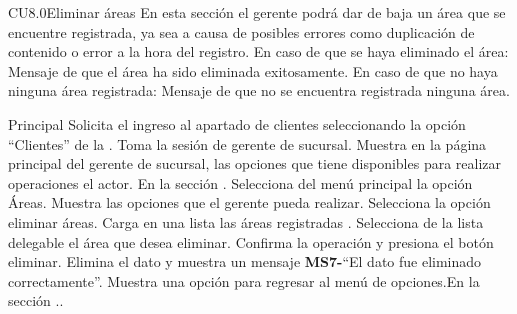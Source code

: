 

	\begin{UseCase}{CU8.0}{Eliminar áreas}{
		En esta sección el gerente podrá dar de baja un área que se encuentre registrada, ya sea a causa de posibles errores como duplicación de contenido o error a la hora del registro.
	}
		{
		En caso de que se haya eliminado el área:
		Mensaje de que el área ha sido eliminada exitosamente.
		En caso de que no haya ninguna área registrada:
		Mensaje de que no se encuentra registrada ninguna área.}

	\end{UseCase}

\begin{UCtrayectoria}{Principal}
		\UCpaso[\UCactor] Solicita el ingreso al apartado de clientes seleccionando la opción ``Clientes'' de la .
		\UCpaso Toma la sesión de gerente de sucursal.
		\UCpaso Muestra en la página principal del gerente de sucursal, las opciones que tiene disponibles para realizar operaciones el actor. En la sección .
		\UCpaso[\UCactor] Selecciona del menú principal la opción Áreas.
		\UCpaso Muestra las opciones que el gerente pueda realizar.
		\UCpaso[\UCactor] Selecciona la opción eliminar áreas.
		\UCpaso Carga en una lista las áreas registradas .
		\UCpaso[\UCactor] Selecciona de la lista delegable el área que desea eliminar.
		\UCpaso[\UCactor] Confirma la operación y presiona el botón eliminar.
		\UCpaso Elimina el dato y muestra un mensaje {\bf MS7-}``El dato fue eliminado correctamente''.
		\UCpaso Muestra una opción para regresar al menú de opciones.En la sección .. 
	\end{UCtrayectoria}

